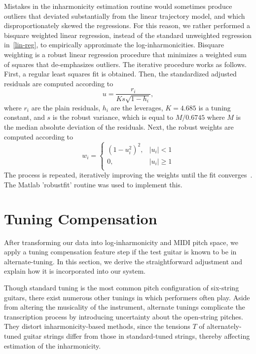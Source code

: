 \documentclass[12pt]{cmuthesis}
\begin{document}
Mistakes in the inharmonicity estimation routine would sometimes produce outliers that deviated substantially from the linear trajectory model, and which disproportionately skewed the regressions. For this reason, we rather performed a bisquare weighted linear regression, instead of the standard unweighted regression in~\eqref{lin-reg}, to empirically approximate the log-inharmonicities. Bisquare weighting is a robust linear regression procedure that minimizes a weighted sum of squares that de-emphasizes outliers. The iterative procedure works as follows. First, a regular least squares fit is obtained. Then, the standardized adjusted residuals are computed according to
\begin{equation}
u = \frac{r_i}{Ks\sqrt{1-h_i}},
\end{equation}
where $r_i$ are the plain residuals, $h_i$ are the leverages, $K = 4.685$ is a tuning constant, and $s$ is the robust variance, which is equal to $M/0.6745$ where $M$ is the median absolute deviation of the residuals. Next, the robust weights are computed according to
\begin{equation}
w_i = \begin{cases}
(1-u_i^2)^2, & |u_i| < 1\\
0, & |u_i| \geq 1\\
\end{cases}
\end{equation} 
The process is repeated, iteratively improving the weights until the fit converges~\cite{matlab-robustfit}. The Matlab 'robustfit' routine was used to implement this.

\section{Tuning Compensation}
After transforming our data into log-inharmonicity and MIDI pitch space, we apply a tuning compensation feature step if the test guitar is known to be in alternate-tuning. In this section, we derive the straightforward adjustment and explain how it is incorporated into our system. 

Though standard tuning is the most common pitch configuration of six-string guitars, there exist numerous other tunings in which performers often play. Aside from altering the musicality of the instrument, alternate tunings complicate the transcription process by introducing uncertainty about the open-string pitches. They distort inharmonicity-based methods, since the tensions $T$ of alternately-tuned guitar strings differ from those in standard-tuned strings, thereby affecting estimation of the inharmonicity. 
\end{document}
